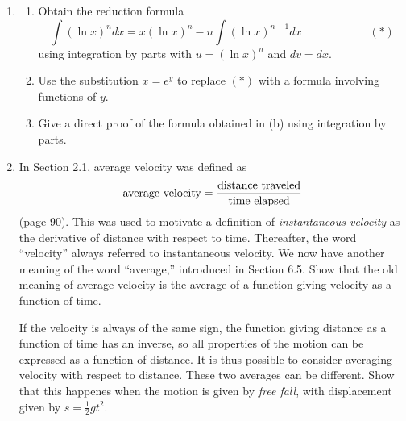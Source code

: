 \documentclass[12pt]{article}
\begin{document}
\begin{enumerate}
\begin{enumerate}
\end{enumerate}

\item \begin{enumerate}

\item Obtain the reduction formula
$$\int (\ln x)^{n} dx = x(\ln x)^{n}-n \int (\ln x)^{n-1} dx\hspace{6em} (*)$$
using integration by parts with $u=(\ln x)^{n}$ and $dv= dx$.

\item Use the substitution $x=e^{y}$ to replace $(*)$ with a 
formula involving functions of $y$.

\item Give a direct proof of the formula obtained in (b) 
using integration by parts.

\end{enumerate}


\item In Section 2.1, average velocity
was defined as 
$$\mbox{\rm average velocity}=\frac{\mbox{\rm distance traveled}}
{\mbox{\rm time elapsed}}$$
(page 90). This was used to motivate a definition of 
{\it instantaneous velocity} as the derivative of distance 
with respect to time. Thereafter, the word ``velocity'' always
referred to instantaneous velocity. We now have another meaning of the 
word ``average,'' introduced in Section 6.5. Show that the old
meaning of average velocity is the average of a function 
giving velocity as a function of time.

If the velocity is always of the same sign, the function giving distance as 
a function of time has an inverse, so all properties of the motion
can be expressed as a function of distance. It is thus possible 
to consider averaging velocity with respect to distance. These two averages
can be different. Show that this happenes when the motion is given by 
{\it free fall}, with displacement given by $s=\frac{1}{2}gt^{2}$. 

\end{enumerate}
\end{document}
